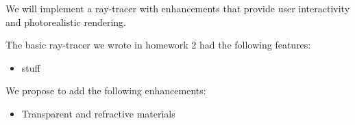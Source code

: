 \documentclass[12pt]{article}
\begin{document}
We will implement a ray-tracer with enhancements that provide user interactivity and photorealistic rendering.

The basic ray-tracer we wrote in homework 2 had the following features:
\begin{itemize}
    \item stuff

\end{itemize}

We propose to add the following enhancements:
\begin{itemize}
    \item Transparent and refractive materials

\end{itemize}
\end{document}
